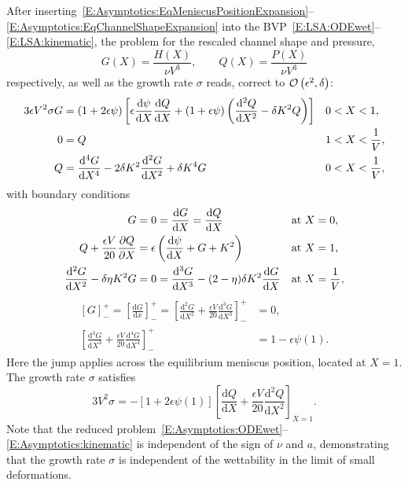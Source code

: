 \documentclass{jfm}
\newcommand{\dd}[2]{\frac{\mathrm{d} #1}{\mathrm{d} #2}}
\newcommand{\ddp}[2]{\frac{\partial #1}{\partial #2}}
\newcommand{\poisson}{\eta} %
\newcommand{\aspect}{a} %
\begin{document}
After inserting~\eqref{E:Asymptotics:EqMeniscusPositionExpansion}--\eqref{E:Asymptotics:EqChannelShapeExpansion} into the BVP~\eqref{E:LSA:ODEwet}--\eqref{E:LSA:kinematic}, the problem for the rescaled channel shape and pressure,
\begin{equation}
G(X) = \frac{H(X)}{\nu V^3}, \qquad Q(X) = \frac{P(X)}{\nu V^3}
\end{equation}
respectively, as well as the growth rate $\sigma$ reads, correct to $\mathcal{O}\left(\epsilon^2, \delta \right)$:
\begin{align}
3\epsilon V^2 \sigma G &= \left(1 + 2\epsilon \psi\right)\left[\epsilon\dd{\psi}{X} \dd{Q}{X} + \left(1 + \epsilon \psi\right)\left(\dd{^2 Q}{X^2} -\param K^2 Q\right)\right] & &0 < X < 1,\label{E:Asymptotics:ODEwet}\\
0 &= Q & &1 < X < \frac{1}{V},\label{E:Asymptotics:ODEdry}\\
Q &= \dd{^4 G}{X^4} - 2\param K^2 \dd{^2 G}{X^2} +\param K^4 G & &0 < X<\frac{1}{V},\label{A:Asymptotics:state_BVP:pressure2shape}
\end{align}
with boundary conditions
\begin{align}
G &= 0 = \dd{G}{X} = \dd{Q}{X} & &\text{at}~X = 0,\label{E:Asymptotics:BC_at_0}\\
Q + \frac{\epsilon V}{20}\ddp{Q}{X} &= \epsilon\left(\dd{\psi}{X} + G + K^2\right)  & &\text{at}~X= 1,\label{E:Asymptotics:pressure_bc}\\
\dd{^2 G}{X^2} -\param \poisson K^2 G &= 0 = \dd{^3 G}{X^3} - (2-\poisson)\param K^2 \dd{G}{X} & &\text{at}~X = \frac{1}{V},\label{E:Asymptotics:BC_at_1}
\end{align}
\begin{align}\label{E:Asymptotics:jump_conds}
\left[G\right]_-^+= \left[\dd{G}{x}\right]_-^+ = \left[\dd{^2G}{X^2} + \frac{\epsilon V}{20}\dd{^3 G}{X^3}\right]_-^+&= 0, \\
\left[\dd{^3 G}{X^3} + \frac{\epsilon V}{20}\dd{^4 G}{X^4}\right]_-^+ &= 1 - \epsilon \psi(1).
\end{align}
Here the jump applies across the equilibrium meniscus position, located at $X = 1$. The growth rate $\sigma$ satisfies
\begin{equation}\label{E:Asymptotics:kinematic}
3V^2\sigma = -\left[1 + 2\epsilon \psi(1)\right]\left[\dd{Q}{X} + \frac{\epsilon V}{20}\dd{^2 Q}{X^2}\right]_{X = 1}.
\end{equation}
Note that the reduced problem~\eqref{E:Asymptotics:ODEwet}--\eqref{E:Asymptotics:kinematic} is independent of the sign of $\nu$ and $\aspect$, demonstrating that the growth rate $\sigma$ is independent of the wettability in the limit of small deformations.
\end{document}
